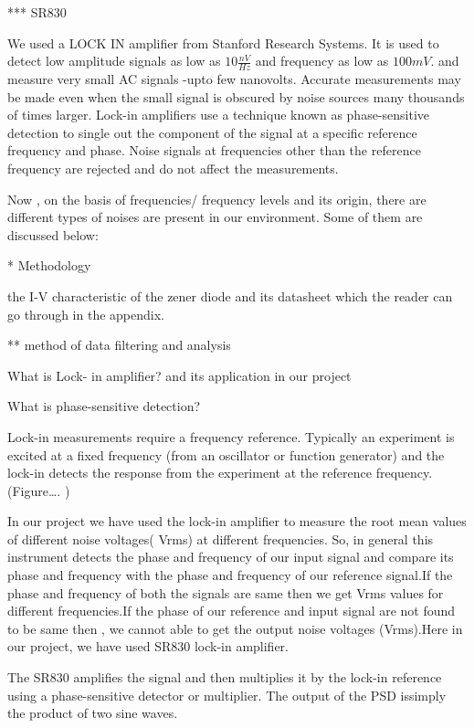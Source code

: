 \documentclass[final,5p,12pt,twocolumn]{elsaarticle}
\begin{document}
*** SR830 

We used a LOCK IN amplifier from Stanford Research Systems. It is used to detect low amplitude signals as low as $10\frac{nV}{Hz}$ and frequency as low as $100mV$.  and measure very small AC signals -upto few nanovolts. Accurate measurements may be made even when the small signal is obscured by noise sources many thousands of times larger.
Lock-in amplifiers use a technique known as
phase-sensitive detection to single out the component of the signal at a specific reference frequency and phase. Noise signals at frequencies other than the reference frequency are rejected and do not affect the measurements.


Now , on the basis of frequencies/ frequency levels and its origin, there are different types of noises are present in our environment. Some of them are discussed below:


* Methodology

the I-V characteristic of the zener diode and its datasheet which the reader can go through in the appendix. 



** method of data filtering and analysis



What is Lock- in amplifier? and its application in our project


What is phase-sensitive detection?

Lock-in measurements require a frequency reference. Typically an experiment is excited at a fixed frequency (from an oscillator or function generator) and the lock-in detects the response from the experiment at the reference frequency. 
(Figure…. )

In our project we have used the lock-in amplifier to measure the root mean values of different noise voltages( Vrms) at different frequencies. So, in general this instrument detects the phase and frequency of our input signal and compare its phase and frequency with the phase and frequency of our reference signal.If the phase and frequency of both the signals are same then we get Vrms values for different frequencies.If the phase of our reference and input signal are not found to be same then , we cannot able to get the output noise voltages (Vrms).Here in our project, we have used SR830 lock-in amplifier.

The SR830 amplifies the signal and then multiplies it by the lock-in reference using a phase-sensitive detector or multiplier. The output of the PSD issimply the product of two sine waves.
\end{document}
